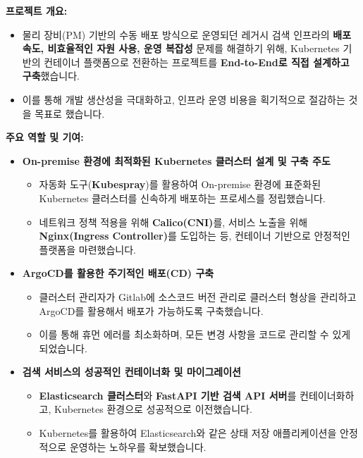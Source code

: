 \documentclass[letterpaper,11pt]{article}
\begin{document}
      {
        \textbf{프로젝트 개요:}
        \begin{itemize}[leftmargin=*]
            \item 물리 장비(PM) 기반의 수동 배포 방식으로 운영되던 레거시 검색 인프라의 \textbf{배포 속도, 비효율적인 자원 사용, 운영 복잡성} 문제를 해결하기 위해, Kubernetes 기반의 컨테이너 플랫폼으로 전환하는 프로젝트를 \textbf{End-to-End로 직접 설계하고 구축}했습니다.
            \item 이를 통해 개발 생산성을 극대화하고, 인프라 운영 비용을 획기적으로 절감하는 것을 목표로 했습니다.
        \end{itemize}

        \textbf{주요 역할 및 기여:}
        \begin{itemize}[leftmargin=*]
            \item \textbf{On-premise 환경에 최적화된 Kubernetes 클러스터 설계 및 구축 주도}
                \begin{itemize}[leftmargin=*, label=$\circ$]
                    \item 자동화 도구(\textbf{Kubespray})를 활용하여 On-premise 환경에 표준화된 Kubernetes 클러스터를 신속하게 배포하는 프로세스를 정립했습니다.
                    \item 네트워크 정책 적용을 위해 \textbf{Calico(CNI)}를, 서비스 노출을 위해 \textbf{Nginx(Ingress Controller)}를 도입하는 등, 컨테이너 기반으로 안정적인 플랫폼을 마련했습니다.
                \end{itemize}

            \item \textbf{ArgoCD를 활용한 주기적인 배포(CD) 구축}
                \begin{itemize}[leftmargin=*, label=$\circ$]
                    \item 클러스터 관리자가 Gitlab에 소스코드 버전 관리로 클러스터 형상을 관리하고 ArgoCD를 활용해서 배포가 가능하도록 구축했습니다.
                    \item 이를 통해 휴먼 에러를 최소화하며, 모든 변경 사항을 코드로 관리할 수 있게 되었습니다.
                \end{itemize}
                
            \item \textbf{검색 서비스의 성공적인 컨테이너화 및 마이그레이션}
                \begin{itemize}[leftmargin=*, label=$\circ$]
                    \item \textbf{Elasticsearch 클러스터}와 \textbf{FastAPI 기반 검색 API 서버}를 컨테이너화하고, Kubernetes 환경으로 성공적으로 이전했습니다.
                    \item Kubernetes를 활용하여 Elasticsearch와 같은 상태 저장 애플리케이션을 안정적으로 운영하는 노하우를 확보했습니다.
                \end{itemize}
                

\end{itemize}}
\end{document}
